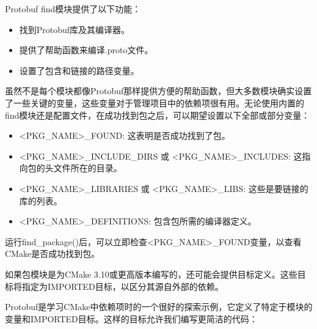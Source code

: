 Protobuf find模块提供了以下功能：

\begin{itemize}
\item
找到Protobuf库及其编译器。

\item
提供了帮助函数来编译.proto文件。

\item
设置了包含和链接的路径变量。
\end{itemize}

虽然不是每个模块都像Protobuf那样提供方便的帮助函数，但大多数模块确实设置了一些关键的变量，这些变量对于管理项目中的依赖项很有用。无论使用内置的find模块还是配置文件，在成功找到包之后，可以期望设置以下全部或部分变量：

\begin{itemize}
\item
<PKG\_NAME>\_FOUND: 这表明是否成功找到了包。

\item
<PKG\_NAME>\_INCLUDE\_DIRS 或 <PKG\_NAME>\_INCLUDES: 这指向包的头文件所在的目录。

\item
<PKG\_NAME>\_LIBRARIES 或 <PKG\_NAME>\_LIBS: 这些是要链接的库的列表。

\item
<PKG\_NAME>\_DEFINITIONS: 包含包所需的编译器定义。
\end{itemize}

运行find\_package()后，可以立即检查<PKG\_NAME>\_FOUND变量，以查看CMake是否成功找到包。

如果包模块是为CMake 3.10或更高版本编写的，还可能会提供目标定义。这些目标将指定为IMPORTED目标，以区分其源自外部的依赖。

Protobuf是学习CMake中依赖项时的一个很好的探索示例，它定义了特定于模块的变量和IMPORTED目标。这样的目标允许我们编写更简洁的代码：



